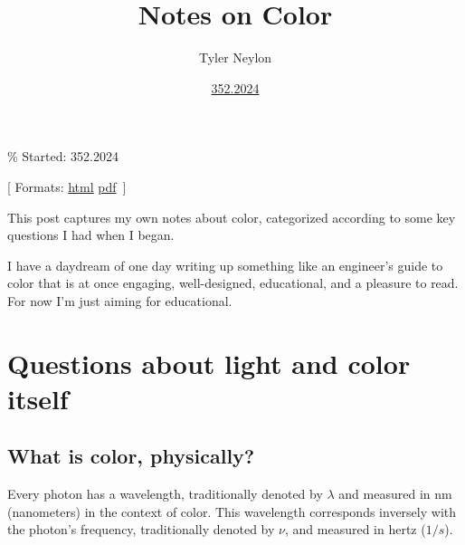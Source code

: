 \documentclass[
]{article}
\title{Notes on Color}
\author{Tyler Neylon}
\date{\href{https://tylerneylon.com/a/7date/}{352.2024}}
\newcommand{\class}[1]{}
\newcommand{\optquad}{\quad}
\newcommand{\smallscrneg}{}
\newcommand{\smallscr}[1]{}
\newcommand{\bigscr}[1]{#1}
\newcommand{\smallscrskip}[1]{}
\begin{document}
\maketitle

\% Started: 352.2024

\newcommand{\R}{\mathbb{R}}
\newcommand{\N}{\mathbb{N}}
\newcommand{\eqnset}[1]{\left.\mbox{$#1$}\;\;\right\rbrace\class{postbrace}{ }}
\providecommand{\latexonlyrule}[3][]{}
\providecommand{\optquad}{\class{optquad}{}}
\providecommand{\smallscrneg}{\class{smallscrneg}{ }}
\providecommand{\bigscr}[1]{\class{bigscr}{#1}}
\providecommand{\smallscr}[1]{\class{smallscr}{#1}}
\providecommand{\smallscrskip}[1]{\class{smallscrskip}{\hskip #1}}

\newcommand{\mydots}{{\cdot}\kern -0.1pt{\cdot}\kern -0.1pt{\cdot}}

\newcommand{\?}{\stackrel{?}{=}}
\newcommand{\sign}{\textsf{sign}}
\newcommand{\order}{\textsf{order}}
\newcommand{\flips}{\textsf{flips}}
\newcommand{\samecycles}{\textsf{same$\\\_$cycles}}
\newcommand{\canon}{\textsf{canon}}
\newcommand{\cs}{\mathsf{cs}}
\newcommand{\dist}{\mathsf{dist}}
\renewcommand{\theenumi}{(\roman{enumi})}

{[} Formats:
\href{http://tylerneylon.com/a/color_notes/color_notes.html}{html}
\textbar{}
\href{http://tylerneylon.com/a/color_notes/color_notes.pdf}{pdf}
\(\,\){]}

This post captures my own notes about color, categorized according to
some key questions I had when I began.

I have a daydream of one day writing up something like an engineer's
guide to color that is at once engaging, well-designed, educational, and
a pleasure to read. For now I'm just aiming for educational.

\hypertarget{questions-about-light-and-color-itself}{%
\section{Questions about light and color
itself}\label{questions-about-light-and-color-itself}}

\hypertarget{what-is-color-physically}{%
\subsection{What is color, physically?}\label{what-is-color-physically}}

Every photon has a wavelength, traditionally denoted by \(\lambda\) and
measured in nm (nanometers) in the context of color. This wavelength
corresponds inversely with the photon's frequency, traditionally denoted
by \(\nu\), and measured in hertz (\(1/s\)).
\end{document}
